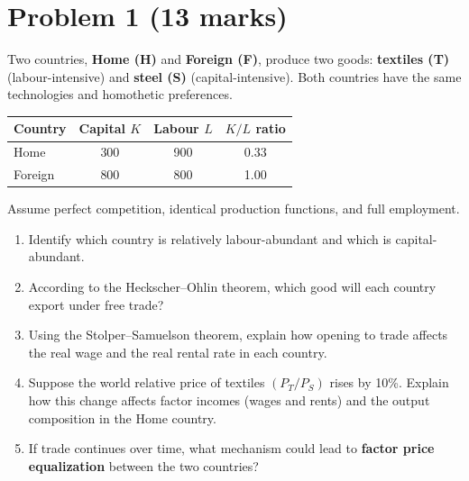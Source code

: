 \documentclass[12pt]{article}
\begin{document}
\section*{Problem 1 (13 marks) }

Two countries, \textbf{Home (H)} and \textbf{Foreign (F)}, produce two goods: \textbf{textiles (T)} (labour-intensive) and \textbf{steel (S)} (capital-intensive).  
Both countries have the same technologies and homothetic preferences.

\begin{center}
\begin{tabular}{lccc}
\toprule
\textbf{Country} & \textbf{Capital $K$} & \textbf{Labour $L$} & \textbf{$K/L$ ratio} \\
\midrule
Home & 300 & 900 & 0.33 \\
Foreign & 800 & 800 & 1.00 \\
\bottomrule
\end{tabular}
\end{center}

Assume perfect competition, identical production functions, and full employment.

\begin{enumerate}[label=(\arabic*)]
\item Identify which country is relatively labour-abundant and which is capital-abundant.  
\item According to the Heckscher--Ohlin theorem, which good will each country export under free trade?  
\item Using the Stolper--Samuelson theorem, explain how opening to trade affects the real wage and the real rental rate in each country.  
\item Suppose the world relative price of textiles $(P_T/P_S)$ rises by 10\%.  
Explain how this change affects factor incomes (wages and rents) and the output composition in the Home country.  
\item If trade continues over time, what mechanism could lead to \textbf{factor price equalization} between the two countries?  
\end{enumerate}
\end{document}
